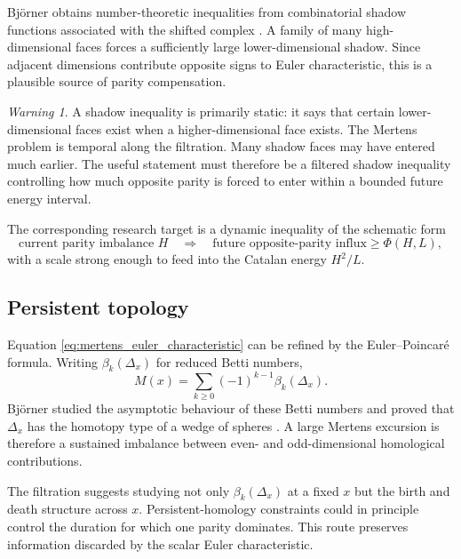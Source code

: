 \documentclass[11pt]{amsart}
\numberwithin{equation}{section}
\theoremstyle{plain}
\theoremstyle{definition}
\theoremstyle{remark}
\newtheorem{warning}[theorem]{Warning}
\newcommand{\Mert}{M}
\begin{document}
Bj\"orner obtains number-theoretic inequalities from combinatorial shadow functions associated with the shifted complex \cite{Bjorner2011}.  A family of many high-dimensional faces forces a sufficiently large lower-dimensional shadow.  Since adjacent dimensions contribute opposite signs to Euler characteristic, this is a plausible source of parity compensation.

\begin{warning}
\label{warn:shadow_temporal_gap}
A shadow inequality is primarily static: it says that certain lower-dimensional faces exist when a higher-dimensional face exists.  The Mertens problem is temporal along the filtration.  Many shadow faces may have entered much earlier.  The useful statement must therefore be a filtered shadow inequality controlling how much opposite parity is forced to enter within a bounded future energy interval.
\end{warning}

The corresponding research target is a dynamic inequality of the schematic form
\begin{equation}
\text{current parity imbalance }H
\quad\Longrightarrow\quad
\text{future opposite-parity influx}\ge \Phi(H,L),
\label{eq:dynamic_shadow_target}
\end{equation}
with a scale strong enough to feed into the Catalan energy $H^2/L$.

\subsection{Persistent topology}
\label{subsec:persistent_topology}

Equation \eqref{eq:mertens_euler_characteristic} can be refined by the Euler--Poincar\'e formula.  Writing $\beta_k(\Delta_x)$ for reduced Betti numbers,
\begin{equation}
\Mert(x)
=
\sum_{k\ge0}(-1)^{k-1}\beta_k(\Delta_x).
\label{eq:mertens_betti_alternation}
\end{equation}
Björner studied the asymptotic behaviour of these Betti numbers and proved that $\Delta_x$ has the homotopy type of a wedge of spheres \cite{Bjorner2011}.  A large Mertens excursion is therefore a sustained imbalance between even- and odd-dimensional homological contributions.

The filtration suggests studying not only $\beta_k(\Delta_x)$ at a fixed $x$ but the birth and death structure across $x$.  Persistent-homology constraints could in principle control the duration for which one parity dominates.  This route preserves information discarded by the scalar Euler characteristic.
\end{document}
